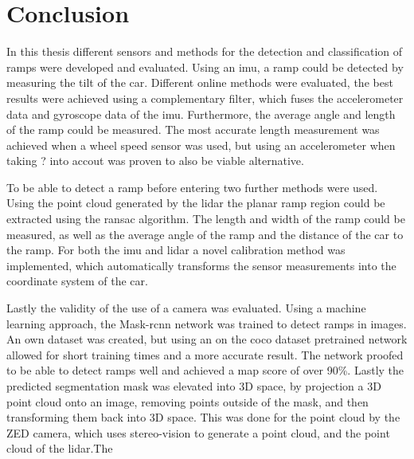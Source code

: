 \section{Conclusion}
In this thesis different sensors and methods for the detection and classification of ramps were developed and evaluated.
Using an \gls{imu}, a ramp could be detected by measuring the tilt of the car.
Different online methods were evaluated, the best results were achieved using a complementary filter, which fuses the accelerometer data and gyroscope data of the \gls{imu}.
Furthermore, the average angle and length of the ramp could be measured.
The most accurate length measurement was achieved when a wheel speed sensor was used, but using an accelerometer when taking ? into accout was proven to also be viable alternative.\par
To be able to detect a ramp before entering two further methods were used.
Using the point cloud generated by the \gls{lidar} the planar ramp region could be extracted using the \gls{ransac} algorithm.
The length and width of the ramp could be measured, as well as the average angle of the ramp and the distance of the car to the ramp.
For both the \gls{imu} and \gls{lidar} a novel calibration method was implemented, which automatically transforms the sensor measurements into the coordinate system of the car.\par
Lastly the validity of the use of a camera was evaluated.
Using a machine learning approach, the Mask-\gls{rcnn} network was trained to detect ramps in images.
An own dataset was created, but using an on the \gls{coco} dataset pretrained network allowed for short training times and a more accurate result.
The network proofed to be able to detect ramps well and achieved a \gls{map} score of over 90\%.
Lastly the predicted segmentation mask was elevated into 3D space, by projection a 3D point cloud onto an image, removing points outside of the mask, and then transforming them back into 3D space.
This was done for the point cloud by the ZED camera, which uses stereo-vision to generate a point cloud, and the point cloud of the \gls{lidar}.The

